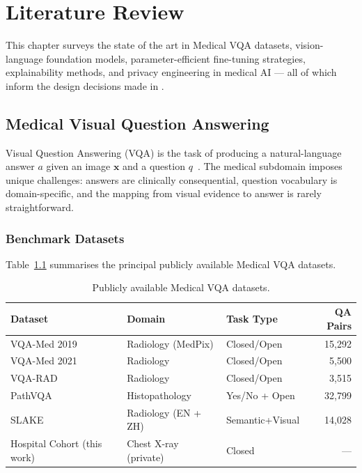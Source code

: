 \chapter{Literature Review}
\label{ch:lit}

\begin{infobox}
This chapter surveys the state of the art in Medical VQA datasets,
vision-language foundation models, parameter-efficient fine-tuning
strategies, explainability methods, and privacy engineering in medical AI ---
all of which inform the design decisions made in \medxplain.
\end{infobox}

\section{Medical Visual Question Answering}
\label{sec:lit_vqa}

Visual Question Answering (VQA) is the task of producing a natural-language
answer $a$ given an image $\mathbf{x}$ and a question $q$~\citep{antol2015vqa}.
The medical subdomain imposes unique challenges: answers are clinically
consequential, question vocabulary is domain-specific, and the mapping from
visual evidence to answer is rarely straightforward.

\subsection{Benchmark Datasets}
\label{subsec:datasets}

Table~\ref{tab:datasets} summarises the principal publicly available
Medical VQA datasets.

\begin{table}[htbp]
\centering
\caption{Publicly available Medical VQA datasets.}
\label{tab:datasets}
\begin{tabular}{@{}lllr@{}}
\toprule
\textbf{Dataset} & \textbf{Domain} & \textbf{Task Type} & \textbf{QA Pairs} \\
\midrule
VQA-Med 2019~\citep{ben2019vqamed}   & Radiology (MedPix)      & Closed/Open & 15{,}292 \\
VQA-Med 2021~\citep{did2021vqamed}   & Radiology               & Closed/Open & 5{,}500  \\
VQA-RAD~\citep{lau2018vqarad}        & Radiology               & Closed/Open & 3{,}515  \\
PathVQA~\citep{he2020pathvqa}        & Histopathology          & Yes/No + Open & 32{,}799 \\
SLAKE~\citep{liu2021slake}           & Radiology (EN + ZH)     & Semantic+Visual & 14{,}028 \\
\midrule
Hospital Cohort (this work)          & Chest X-ray (private)   & Closed      & ---     \\
\bottomrule
\end{tabular}
\end{table}

